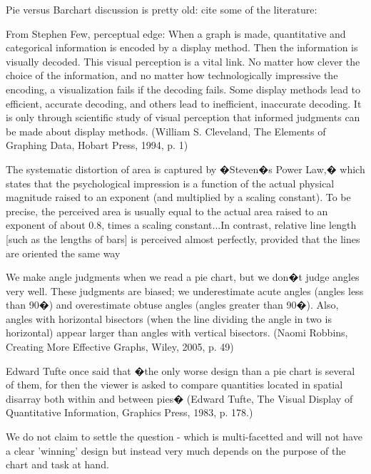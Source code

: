 Pie versus Barchart discussion is pretty old: cite some of the literature:

From Stephen Few, perceptual edge:
	When a graph is made, quantitative and categorical information is encoded by a display method. Then the information is visually decoded. This visual perception is a vital link. No matter how clever the choice of the information, and no matter how technologically impressive the encoding, a visualization fails if the decoding fails. Some display methods lead to efficient, accurate decoding, and others lead to inefficient, inaccurate decoding. It is only through scientific study of visual perception that informed judgments can be made about display methods. (William S. Cleveland, The Elements of Graphing Data, Hobart Press, 1994, p. 1)
	
	The systematic distortion of area is captured by �Steven�s Power Law,� which states that the psychological impression is a function of the actual physical magnitude raised to an exponent (and multiplied by a scaling constant). To be precise, the perceived area is usually equal to the actual area raised to an exponent of about 0.8, times a scaling constant...In contrast, relative line length [such as the lengths of bars] is perceived almost perfectly, provided that the lines are oriented the same way \cite[page=40]{kosslyn:2006}
	
	
	We make angle judgments when we read a pie chart, but we don�t judge angles very well. These judgments are biased; we underestimate acute angles (angles less than 90�) and overestimate obtuse angles (angles greater than 90�). Also, angles with horizontal bisectors (when the line dividing the angle in two is horizontal) appear larger than angles with vertical bisectors. (Naomi Robbins, Creating More Effective Graphs, Wiley, 2005, p. 49)
	
	 Edward Tufte once said that �the only worse design than a pie chart is several of them, for then the viewer is asked to compare quantities located in spatial disarray both within and between pies� (Edward Tufte, The Visual Display of Quantitative Information, Graphics Press, 1983, p. 178.)

 We do not claim to settle the question - which is multi-facetted and will not have a clear 'winning' design but instead very much depends on the purpose of the chart and task at hand.

